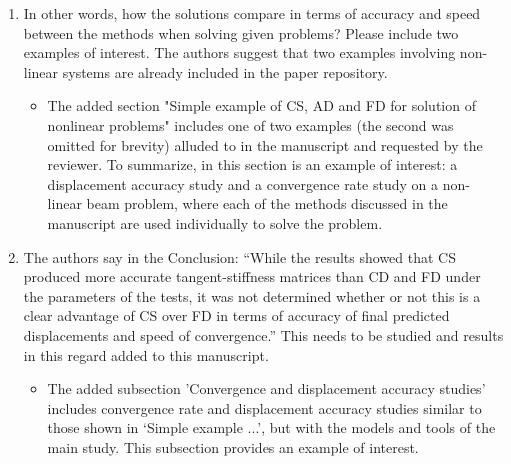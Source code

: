 \documentclass{article}
\begin{document}
\begin{enumerate}
\item 
      In other words, how the solutions compare in terms of accuracy and speed between the methods when
      solving given problems? Please include two examples of interest. The authors
      suggest that two examples involving non-linear systems are already included in the
      paper repository.

{\color{red}
  \begin{itemize}
    \item 
        The added section "Simple example of CS, AD and FD for solution of nonlinear problems" includes one of two examples (the second was omitted for brevity) alluded to in the manuscript and requested by the reviewer.  To summarize, in this section is an example of interest: a displacement accuracy study and a convergence rate study on a non-linear beam problem, where each of the methods discussed in the manuscript are used individually to solve the problem. 
 \end{itemize}}

\item
      The authors say in the Conclusion: “While the results showed that CS
      produced more accurate tangent-stiffness matrices than CD and FD under
      the parameters of the tests, it was not determined whether or not this is
      a clear advantage of CS over FD in terms of accuracy of final predicted
      displacements and speed of convergence.” This needs to be studied and
      results in this regard added to this manuscript.

{\color{red}
  \begin{itemize}
    \item 
      The added subsection 'Convergence and displacement accuracy studies'
      includes convergence rate and displacement accuracy studies similar to
      those shown in `Simple example ...', but with the models and tools of
      the main study. This subsection provides an example of interest. 
  \end{itemize}}
  \end{enumerate}
\end{document}
